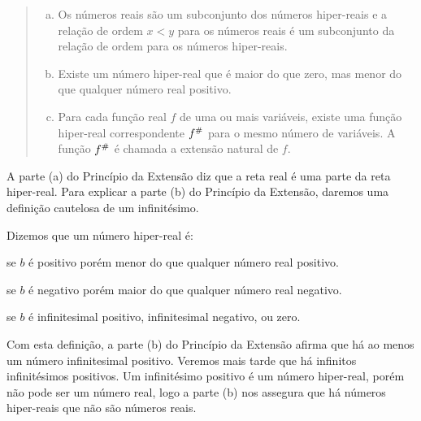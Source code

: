 \begin{quote}
\begin{enumerate}[(a)]
\item Os números reais são um subconjunto dos números hiper-reais
      e a relação de ordem $x < y$ para os números reais é um
      subconjunto da relação de ordem para os números hiper-reais.
\item Existe um número hiper-real que é maior do que zero, mas menor
      do que qualquer número real positivo.
\item Para cada função real $f$ de uma ou mais variáveis, existe
      uma função hiper-real correspondente ${f}^\#$ para o mesmo
      número de variáveis. A função ${f}^\#$ é chamada a extensão
      natural de $f$.
\end{enumerate}
\end{quote}

A parte (a) do Princípio da Extensão diz que a reta real é uma parte
da reta hiper-real. Para explicar a parte (b) do Princípio da Extensão,
daremos uma definição cautelosa de um infinitésimo.

\begin{defin}
Dizemos que um número hiper-real é:

 se $b$ é
positivo porém menor do que qualquer número real positivo.

 se $b$ é
negativo porém maior do que qualquer número real negativo.

 se $b$ é infinitesimal positivo, infinitesimal
negativo, ou zero.
\end{defin}

Com esta definição, a parte (b) do Princípio da Extensão afirma que há
ao menos um número infinitesimal positivo. Veremos mais tarde que há
infinitos infinitésimos positivos. Um infinitésimo positivo é um número
hiper-real, porém não pode ser um número real, logo a parte (b) nos
assegura que há números hiper-reais que não são números reais.

